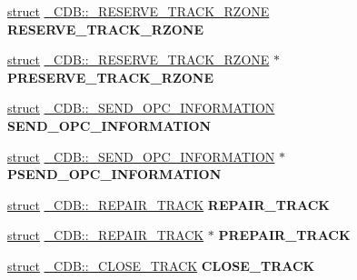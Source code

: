 \begin{DoxyCompactItemize}
\hyperlink{interfacestruct}{struct} \hyperlink{struct___c_d_b_1_1___r_e_s_e_r_v_e___t_r_a_c_k___r_z_o_n_e}{\+\_\+\+C\+D\+B\+::\+\_\+\+R\+E\+S\+E\+R\+V\+E\+\_\+\+T\+R\+A\+C\+K\+\_\+\+R\+Z\+O\+NE} {\bfseries R\+E\+S\+E\+R\+V\+E\+\_\+\+T\+R\+A\+C\+K\+\_\+\+R\+Z\+O\+NE}
\item 
\mbox{\label{union___c_d_b_a84edd208119d033db26d449ebc6b0413}} 
\hyperlink{interfacestruct}{struct} \hyperlink{struct___c_d_b_1_1___r_e_s_e_r_v_e___t_r_a_c_k___r_z_o_n_e}{\+\_\+\+C\+D\+B\+::\+\_\+\+R\+E\+S\+E\+R\+V\+E\+\_\+\+T\+R\+A\+C\+K\+\_\+\+R\+Z\+O\+NE} $\ast$ {\bfseries P\+R\+E\+S\+E\+R\+V\+E\+\_\+\+T\+R\+A\+C\+K\+\_\+\+R\+Z\+O\+NE}
\item 
\mbox{\label{union___c_d_b_a313f520b408ad9d439d65284dad78858}} 
\hyperlink{interfacestruct}{struct} \hyperlink{struct___c_d_b_1_1___s_e_n_d___o_p_c___i_n_f_o_r_m_a_t_i_o_n}{\+\_\+\+C\+D\+B\+::\+\_\+\+S\+E\+N\+D\+\_\+\+O\+P\+C\+\_\+\+I\+N\+F\+O\+R\+M\+A\+T\+I\+ON} {\bfseries S\+E\+N\+D\+\_\+\+O\+P\+C\+\_\+\+I\+N\+F\+O\+R\+M\+A\+T\+I\+ON}
\item 
\mbox{\label{union___c_d_b_aa33f821a7b1067f08205a266565efb4f}} 
\hyperlink{interfacestruct}{struct} \hyperlink{struct___c_d_b_1_1___s_e_n_d___o_p_c___i_n_f_o_r_m_a_t_i_o_n}{\+\_\+\+C\+D\+B\+::\+\_\+\+S\+E\+N\+D\+\_\+\+O\+P\+C\+\_\+\+I\+N\+F\+O\+R\+M\+A\+T\+I\+ON} $\ast$ {\bfseries P\+S\+E\+N\+D\+\_\+\+O\+P\+C\+\_\+\+I\+N\+F\+O\+R\+M\+A\+T\+I\+ON}
\item 
\mbox{\label{union___c_d_b_af1dc8531bd625b49770576fd09c9bb1c}} 
\hyperlink{interfacestruct}{struct} \hyperlink{struct___c_d_b_1_1___r_e_p_a_i_r___t_r_a_c_k}{\+\_\+\+C\+D\+B\+::\+\_\+\+R\+E\+P\+A\+I\+R\+\_\+\+T\+R\+A\+CK} {\bfseries R\+E\+P\+A\+I\+R\+\_\+\+T\+R\+A\+CK}
\item 
\mbox{\label{union___c_d_b_a3689956156e76f07845b102585105b90}} 
\hyperlink{interfacestruct}{struct} \hyperlink{struct___c_d_b_1_1___r_e_p_a_i_r___t_r_a_c_k}{\+\_\+\+C\+D\+B\+::\+\_\+\+R\+E\+P\+A\+I\+R\+\_\+\+T\+R\+A\+CK} $\ast$ {\bfseries P\+R\+E\+P\+A\+I\+R\+\_\+\+T\+R\+A\+CK}
\item 
\mbox{\label{union___c_d_b_ab3dce7ddf267dea9607b9f6d29ab7567}} 
\hyperlink{interfacestruct}{struct} \hyperlink{struct___c_d_b_1_1___c_l_o_s_e___t_r_a_c_k}{\+\_\+\+C\+D\+B\+::\+\_\+\+C\+L\+O\+S\+E\+\_\+\+T\+R\+A\+CK} {\bfseries C\+L\+O\+S\+E\+\_\+\+T\+R\+A\+CK}

\end{DoxyCompactItemize}
